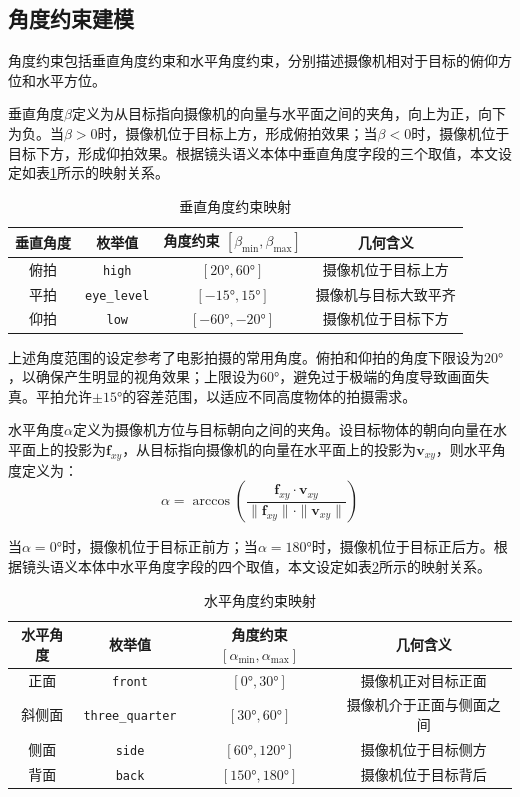\subsection{角度约束建模}

角度约束包括垂直角度约束和水平角度约束，分别描述摄像机相对于目标的俯仰方位和水平方位。

垂直角度$\beta$定义为从目标指向摄像机的向量与水平面之间的夹角，向上为正，向下为负。当$\beta > 0$时，摄像机位于目标上方，形成俯拍效果；当$\beta < 0$时，摄像机位于目标下方，形成仰拍效果。根据镜头语义本体中垂直角度字段的三个取值，本文设定如表\ref{tab:vertical_angle_constraint}所示的映射关系。

\begin{table}[htbp]
\centering
\caption{垂直角度约束映射}
\label{tab:vertical_angle_constraint}
\begin{tabular}{cccc}
\toprule
垂直角度 & 枚举值 & 角度约束 $[\beta_{\min}, \beta_{\max}]$ & 几何含义 \\
\midrule
俯拍 & \texttt{high} & $[20°, 60°]$ & 摄像机位于目标上方 \\
平拍 & \texttt{eye\_level} & $[-15°, 15°]$ & 摄像机与目标大致平齐 \\
仰拍 & \texttt{low} & $[-60°, -20°]$ & 摄像机位于目标下方 \\
\bottomrule
\end{tabular}
\end{table}

上述角度范围的设定参考了电影拍摄的常用角度。俯拍和仰拍的角度下限设为$20°$，以确保产生明显的视角效果；上限设为$60°$，避免过于极端的角度导致画面失真。平拍允许$\pm 15°$的容差范围，以适应不同高度物体的拍摄需求。

水平角度$\alpha$定义为摄像机方位与目标朝向之间的夹角。设目标物体的朝向向量在水平面上的投影为$\mathbf{f}_{xy}$，从目标指向摄像机的向量在水平面上的投影为$\mathbf{v}_{xy}$，则水平角度定义为：
\begin{equation}
\alpha = \arccos\left(\frac{\mathbf{f}_{xy} \cdot \mathbf{v}_{xy}}{\|\mathbf{f}_{xy}\| \cdot \|\mathbf{v}_{xy}\|}\right)
\label{eq:horizontal_angle}
\end{equation}

当$\alpha = 0°$时，摄像机位于目标正前方；当$\alpha = 180°$时，摄像机位于目标正后方。根据镜头语义本体中水平角度字段的四个取值，本文设定如表\ref{tab:horizontal_angle_constraint}所示的映射关系。

\begin{table}[htbp]
\centering
\caption{水平角度约束映射}
\label{tab:horizontal_angle_constraint}
\begin{tabular}{cccc}
\toprule
水平角度 & 枚举值 & 角度约束 $[\alpha_{\min}, \alpha_{\max}]$ & 几何含义 \\
\midrule
正面 & \texttt{front} & $[0°, 30°]$ & 摄像机正对目标正面 \\
斜侧面 & \texttt{three\_quarter} & $[30°, 60°]$ & 摄像机介于正面与侧面之间 \\
侧面 & \texttt{side} & $[60°, 120°]$ & 摄像机位于目标侧方 \\
背面 & \texttt{back} & $[150°, 180°]$ & 摄像机位于目标背后 \\
\bottomrule
\end{tabular}
\end{table}


